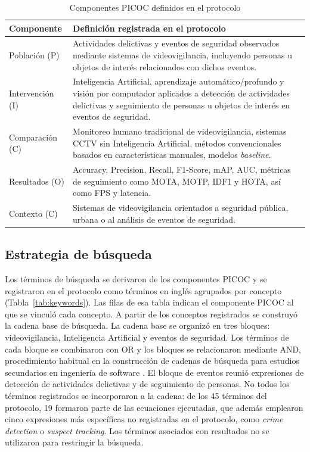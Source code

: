 \documentclass[pdflatex,sn-mathphys-num]{sn-jnl}%
\theoremstyle{thmstyleone}%
\theoremstyle{thmstyletwo}%
\theoremstyle{thmstylethree}%
\begin{document}
\begin{table}[htbp]
\caption{Componentes PICOC definidos en el protocolo}\label{tab:picoc}
\begin{tabular}{@{}L{2.4cm}L{10.1cm}@{}}
\toprule
Componente & Definición registrada en el protocolo \\
\midrule
Población (P) & Actividades delictivas y eventos de seguridad observados mediante sistemas de videovigilancia, incluyendo personas u objetos de interés relacionados con dichos eventos. \\
\addlinespace
Intervención (I) & Inteligencia Artificial, aprendizaje automático/profundo y visión por computador aplicados a detección de actividades delictivas y seguimiento de personas u objetos de interés en eventos de seguridad. \\
\addlinespace
Comparación (C) & Monitoreo humano tradicional de videovigilancia, sistemas CCTV sin Inteligencia Artificial, métodos convencionales basados en características manuales, modelos \textit{baseline}. \\
\addlinespace
Resultados (O) & Accuracy, Precision, Recall, F1-Score, mAP, AUC, métricas de seguimiento como MOTA, MOTP, IDF1 y HOTA, así como FPS y latencia. \\
\addlinespace
Contexto (C) & Sistemas de videovigilancia orientados a seguridad pública, urbana o al análisis de eventos de seguridad. \\
\bottomrule
\end{tabular}
\end{table}

\subsection{Estrategia de búsqueda}\label{subsec:busqueda}

Los términos de búsqueda se derivaron de los componentes PICOC y se registraron en el protocolo como términos en inglés agrupados por concepto (Tabla~\ref{tab:keywords}). Las filas de esa tabla indican el componente PICOC al que se vinculó cada concepto. A partir de los conceptos registrados se construyó la cadena base de búsqueda. La cadena base se organizó en tres bloques: videovigilancia, Inteligencia Artificial y eventos de seguridad. Los términos de cada bloque se combinaron con OR y los bloques se relacionaron mediante AND, procedimiento habitual en la construcción de cadenas de búsqueda para estudios secundarios en ingeniería de software \cite{petersen2015}. El bloque de eventos reunió expresiones de detección de actividades delictivas y de seguimiento de personas. No todos los términos registrados se incorporaron a la cadena: de los 45 términos del protocolo, 19 formaron parte de las ecuaciones ejecutadas, que además emplearon cinco expresiones más específicas no registradas en el protocolo, como \textit{crime detection} o \textit{suspect tracking}. Los términos asociados con resultados no se utilizaron para restringir la búsqueda.
\end{document}
